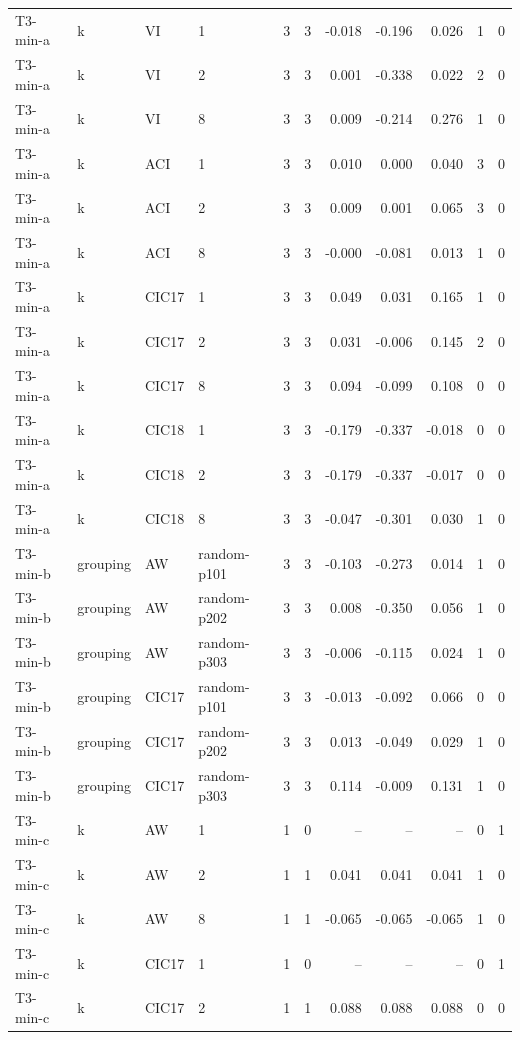 \begin{table}[t]
\begin{tabular}{@{}llllrrrrrrr@{}}
  T3-min-a & k & VI & 1 & 3 & 3 & -0.018 & -0.196 & 0.026 & 1 & 0 \\
  T3-min-a & k & VI & 2 & 3 & 3 & 0.001 & -0.338 & 0.022 & 2 & 0 \\
  T3-min-a & k & VI & 8 & 3 & 3 & 0.009 & -0.214 & 0.276 & 1 & 0 \\
  T3-min-a & k & ACI & 1 & 3 & 3 & 0.010 & 0.000 & 0.040 & 3 & 0 \\
  T3-min-a & k & ACI & 2 & 3 & 3 & 0.009 & 0.001 & 0.065 & 3 & 0 \\
  T3-min-a & k & ACI & 8 & 3 & 3 & -0.000 & -0.081 & 0.013 & 1 & 0 \\
  T3-min-a & k & CIC17 & 1 & 3 & 3 & 0.049 & 0.031 & 0.165 & 1 & 0 \\
  T3-min-a & k & CIC17 & 2 & 3 & 3 & 0.031 & -0.006 & 0.145 & 2 & 0 \\
  T3-min-a & k & CIC17 & 8 & 3 & 3 & 0.094 & -0.099 & 0.108 & 0 & 0 \\
  T3-min-a & k & CIC18 & 1 & 3 & 3 & -0.179 & -0.337 & -0.018 & 0 & 0 \\
  T3-min-a & k & CIC18 & 2 & 3 & 3 & -0.179 & -0.337 & -0.017 & 0 & 0 \\
  T3-min-a & k & CIC18 & 8 & 3 & 3 & -0.047 & -0.301 & 0.030 & 1 & 0 \\
  T3-min-b & grouping & AW & random-p101 & 3 & 3 & -0.103 & -0.273 & 0.014 & 1 & 0 \\
  T3-min-b & grouping & AW & random-p202 & 3 & 3 & 0.008 & -0.350 & 0.056 & 1 & 0 \\
  T3-min-b & grouping & AW & random-p303 & 3 & 3 & -0.006 & -0.115 & 0.024 & 1 & 0 \\
  T3-min-b & grouping & CIC17 & random-p101 & 3 & 3 & -0.013 & -0.092 & 0.066 & 0 & 0 \\
  T3-min-b & grouping & CIC17 & random-p202 & 3 & 3 & 0.013 & -0.049 & 0.029 & 1 & 0 \\
  T3-min-b & grouping & CIC17 & random-p303 & 3 & 3 & 0.114 & -0.009 & 0.131 & 1 & 0 \\
  T3-min-c & k & AW & 1 & 1 & 0 & -- & -- & -- & 0 & 1 \\
  T3-min-c & k & AW & 2 & 1 & 1 & 0.041 & 0.041 & 0.041 & 1 & 0 \\
  T3-min-c & k & AW & 8 & 1 & 1 & -0.065 & -0.065 & -0.065 & 1 & 0 \\
  T3-min-c & k & CIC17 & 1 & 1 & 0 & -- & -- & -- & 0 & 1 \\
  T3-min-c & k & CIC17 & 2 & 1 & 1 & 0.088 & 0.088 & 0.088 & 0 & 0 \\

\end{tabular}
\end{table}

